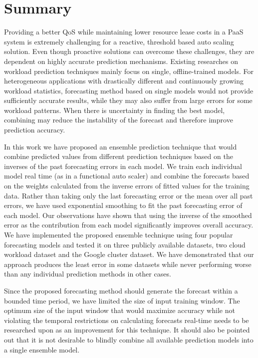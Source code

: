 \section{Summary}

Providing a better QoS while maintaining lower resource lease costs in a PaaS system is extremely challenging for a reactive, threshold based auto scaling solution. Even though proactive solutions can overcome these challenges, they are dependent on highly accurate prediction mechanisms. Existing researches on workload prediction techniques mainly focus on single, offline-trained models. For heterogeneous  applications with drastically different and continuously growing workload statistics, forecasting method based on single models would not provide sufficiently accurate results, while they may also suffer from large errors for some workload patterns. When there is uncertainty in finding the best model, combining may reduce the instability of the forecast and therefore improve prediction accuracy.

In this work we have proposed an ensemble prediction technique that would combine predicted values from different prediction techniques based on the inverses of the past forecasting errors in each model. We train each individual model real time (as in a functional auto scaler) and combine the forecasts based on the weights calculated from the inverse errors of fitted values for the training data. Rather than taking only the last forecasting error or the mean over all past errors, we have used exponential smoothing to fit the past forecasting error of each model. Our observations have shown that using the inverse of the smoothed error as the contribution from each model significantly improves overall accuracy.  We have implemented the proposed ensemble technique using four popular forecasting models and tested it on three publicly available datasets, two cloud workload dataset and the Google cluster dataset.  We have demonstrated that our approach produces the least error in some datasets while never performing worse than any individual prediction methods in other cases.

Since the proposed forecasting method should generate the forecast within a bounded time period, we have limited the size of input training window. The optimum size of the input window that would maximize accuracy while not violating the temporal restrictions on calculating forecasts real-time needs to be researched upon as an improvement for this technique. It should also be pointed out that it is not desirable to blindly combine all available prediction models into a single ensemble model.